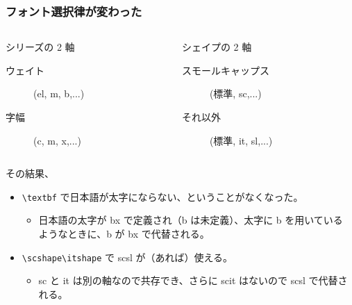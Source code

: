 \documentclass[aspectratio=149]{beamer}
\begin{document}
\begin{frame}
	\frametitle{フォント選択律が変わった}
	\begin{columns}
		\begin{column}{.495\textwidth}
			\begin{block}{シリーズの 2 軸}
			\begin{description}
				\item[ウェイト] ({el}, {m},
					{b},...)
				\item[字幅] ({c}, {m},
					{x},...)
			\end{description}
		\end{block}
		\end{column}
		\begin{column}{.495\textwidth}
			\begin{block}{シェイプの 2 軸}
			\begin{description}
				\item[スモールキャップス] (標準, {sc},...)
				\item[それ以外] (標準, {it}, {sl},...)
			\end{description}
		\end{block}
		\end{column}
	\end{columns}
	
	その結果、
	\begin{itemize}
		\item \texttt{\textbackslash textbf} で日本語が太字にならない、ということがなくなった。
			\begin{itemize}
				\item 日本語の太字が bx で定義され（b は未定義）、太字に b を用いている
					ようなときに、b が bx で代替される。
			\end{itemize}
		\item \texttt{\textbackslash scshape\textbackslash itshape} で
			{scsl} が（あれば）使える。
			\begin{itemize}
				\item sc と it は別の軸なので共存でき、さらに scit はないので scsl で代替される。
			\end{itemize}
	\end{itemize}
\end{frame}
\end{document}
